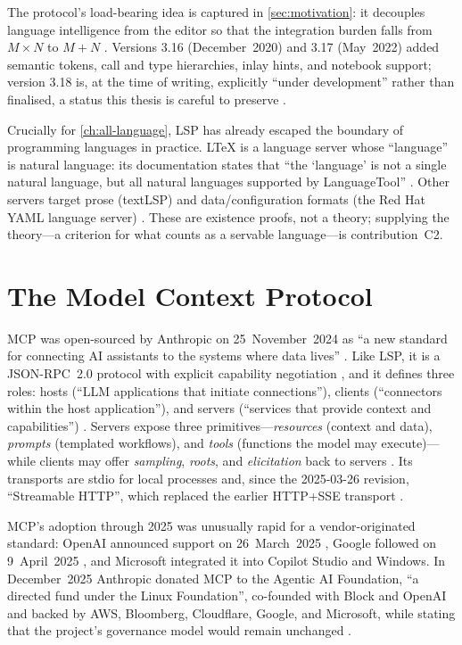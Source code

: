 The protocol's load-bearing idea is captured in \cref{sec:motivation}: it
decouples language intelligence from the editor so that the integration burden
falls from $M \times N$ to $M + N$ \citep{lsp-official,lsp-mxn-fcc}. Versions
3.16 (December~2020) and 3.17 (May~2022) added semantic tokens, call and type
hierarchies, inlay hints, and notebook support; version 3.18 is, at the time of
writing, explicitly ``under development'' rather than finalised, a status this
thesis is careful to preserve \citep{lsp-spec-317,lsp-spec-318}.

Crucially for \cref{ch:all-language}, LSP has already escaped the boundary of
programming languages in practice. LTeX is a language server whose ``language''
is natural language: its documentation states that ``the `language' is not a
single natural language, but all natural languages supported by LanguageTool''
\citep{ltex}. Other servers target prose (textLSP) and data/configuration formats
(the Red Hat YAML language server) \citep{textlsp,yamlls}. These are existence
proofs, not a theory; supplying the theory---a criterion for what counts as a
servable language---is contribution~C2.

\section{The Model Context Protocol}
\label{sec:bg-mcp}

MCP was open-sourced by Anthropic on 25~November~2024 as ``a new standard for
connecting AI assistants to the systems where data lives''
\citep{mcp-anthropic-2024}. Like LSP, it is a JSON-RPC~2.0 protocol with explicit
capability negotiation \citep{mcp-spec-2025}, and it defines three roles: hosts
(``LLM applications that initiate connections''), clients (``connectors within
the host application''), and servers (``services that provide context and
capabilities'') \citep{mcp-spec-2025,mcp-architecture}. Servers expose three
primitives---\emph{resources} (context and data), \emph{prompts} (templated
workflows), and \emph{tools} (functions the model may execute)---while clients may
offer \emph{sampling}, \emph{roots}, and \emph{elicitation} back to servers
\citep{mcp-spec-2025}. Its transports are stdio for local processes and, since
the 2025-03-26 revision, ``Streamable HTTP'', which replaced the earlier HTTP+SSE
transport \citep{mcp-transports-2025,mcp-architecture}.

MCP's adoption through 2025 was unusually rapid for a vendor-originated standard:
OpenAI announced support on 26~March~2025 \citep{openai-mcp-techcrunch}, Google
followed on 9~April~2025 \citep{google-mcp-techcrunch}, and Microsoft integrated
it into Copilot Studio and Windows. In December~2025 Anthropic donated MCP to the
Agentic AI Foundation, ``a directed fund under the Linux Foundation'', co-founded
with Block and OpenAI and backed by AWS, Bloomberg, Cloudflare, Google, and
Microsoft, while stating that the project's governance model would remain
unchanged \citep{mcp-aaif-2025,lf-aaif-press}.

